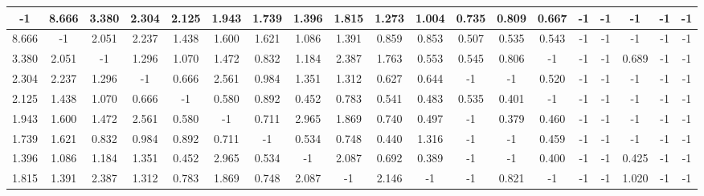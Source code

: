 \documentclass[UTF8,12pt]{ctexart}
\begin{document}
\begin{enumerate}
\begin{itemize}
\begin{table}[H]
{\begin{tiny}
                                \begin{tabular}{ccccccccccccccccccc}
                                    \toprule
                                    -1    & 8.666 & 3.380 & 2.304 & 2.125 & 1.943 & 1.739 & 1.396 & 1.815 & 1.273 & 1.004 & 0.735 & 0.809 & 0.667 & -1    & -1    & -1    & -1    & -1    \\
                                    \midrule
                                    8.666 & -1    & 2.051 & 2.237 & 1.438 & 1.600 & 1.621 & 1.086 & 1.391 & 0.859 & 0.853 & 0.507 & 0.535 & 0.543 & -1    & -1    & -1    & -1    & -1    \\
                                    \midrule
                                    3.380 & 2.051 & -1    & 1.296 & 1.070 & 1.472 & 0.832 & 1.184 & 2.387 & 1.763 & 0.553 & 0.545 & 0.806 & -1    & -1    & -1    & 0.689 & -1    & -1    \\
                                    \midrule
                                    2.304 & 2.237 & 1.296 & -1    & 0.666 & 2.561 & 0.984 & 1.351 & 1.312 & 0.627 & 0.644 & -1    & -1    & 0.520 & -1    & -1    & -1    & -1    & -1    \\
                                    \midrule
                                    2.125 & 1.438 & 1.070 & 0.666 & -1    & 0.580 & 0.892 & 0.452 & 0.783 & 0.541 & 0.483 & 0.535 & 0.401 & -1    & -1    & -1    & -1    & -1    & -1    \\
                                    \midrule
                                    1.943 & 1.600 & 1.472 & 2.561 & 0.580 & -1    & 0.711 & 2.965 & 1.869 & 0.740 & 0.497 & -1    & 0.379 & 0.460 & -1    & -1    & -1    & -1    & -1    \\
                                    \midrule
                                    1.739 & 1.621 & 0.832 & 0.984 & 0.892 & 0.711 & -1    & 0.534 & 0.748 & 0.440 & 1.316 & -1    & -1    & 0.459 & -1    & -1    & -1    & -1    & -1    \\
                                    \midrule
                                    1.396 & 1.086 & 1.184 & 1.351 & 0.452 & 2.965 & 0.534 & -1    & 2.087 & 0.692 & 0.389 & -1    & -1    & 0.400 & -1    & -1    & 0.425 & -1    & -1    \\
                                    \midrule
                                    1.815 & 1.391 & 2.387 & 1.312 & 0.783 & 1.869 & 0.748 & 2.087 & -1    & 2.146 & -1    & -1    & 0.821 & -1    & -1    & -1    & 1.020 & -1    & -1    \\
                                    \midrule

\end{tabular}
\end{tiny}}
\end{table}
\end{itemize}
\end{enumerate}
\end{document}
